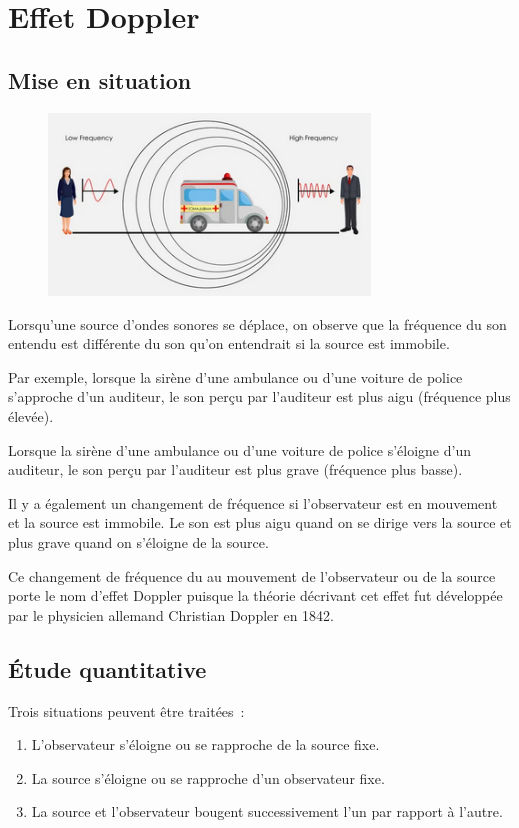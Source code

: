 
\section{Effet Doppler}
\label{leffet-doppler}

\subsection{Mise en situation}

\begin{figure}
\centering
\includegraphics[width=8.557cm,height=4.856cm]{Pictures/1000000100000162000000C9EFEF725F14698266.png}
\caption{}
\end{figure}

Lorsqu'une source d'ondes sonores se déplace, on observe que la
fréquence du son entendu est différente du son qu'on entendrait si la
source est immobile.

Par exemple, lorsque la sirène d'une ambulance ou d'une voiture de
police s'approche d'un auditeur, le son perçu par l'auditeur est plus
aigu (fréquence plus élevée).

Lorsque la sirène d'une ambulance ou d'une voiture de police s'éloigne
d'un auditeur, le son perçu par l'auditeur est plus grave (fréquence
plus basse).

Il y a également un changement de fréquence si l'observateur est en
mouvement et la source est immobile. Le son est plus aigu quand on se
dirige vers la source et plus grave quand on s'éloigne de la source.

Ce changement de fréquence du au mouvement de l'observateur ou de la
source porte le nom d'effet Doppler puisque la théorie décrivant cet
effet fut développée par le physicien allemand Christian Doppler en
1842.

\subsection{Étude quantitative}

Trois situations peuvent être traitées~:
\begin{enumerate}
	\item L'observateur s'éloigne ou se rapproche de la source fixe.
	\item La source s'éloigne ou se rapproche d'un observateur fixe.
	\item La source et l'observateur bougent successivement l'un par rapport à l'autre.
\end{enumerate}

